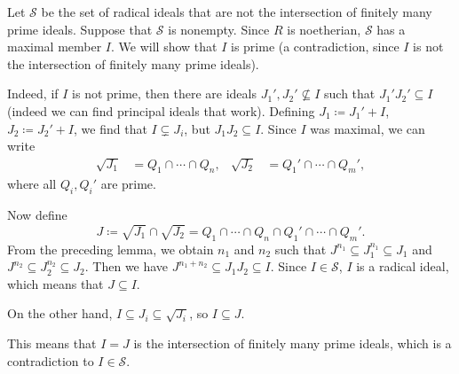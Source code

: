 Let $\mathcal{S}$ be the set of radical ideals that are not the intersection
of finitely many prime ideals. Suppose that $\mathcal{S}$ is nonempty. Since $R$
is noetherian, $\mathcal{S}$ has a maximal member $I$. We will show that $I$ is
prime (a contradiction, since $I$ is not the intersection of finitely many prime
ideals).

Indeed, if $I$ is not prime, then there are ideals $J_1', J_2' \nsubseteq I$ such
that  $J_1'J_2' \subseteq I$ (indeed we can find principal ideals that work).
Defining $J_1\coloneqq J_1' + I$, $J_2\coloneqq J_2' + I$, we find that
$I\subsetneq J_i$, but $J_1J_2 \subseteq I$. Since $I$ was maximal, we can write
\begin{align*}
	\sqrt{J_1} &= Q_1 \cap \cdots \cap Q_n, &
	\sqrt{J_2} &= Q_1'\cap\cdots\cap Q_m',
\end{align*}
where all $Q_i, Q_i'$ are prime.

Now define
\[J\coloneqq \sqrt{J_1}\cap\sqrt{J_2} = Q_1\cap\cdots\cap Q_n \cap Q_1'\cap\cdots\cap Q_m'. \]
From the preceding lemma, we obtain $n_1$ and $n_2$ such that
$J^{n_1} \subseteq J_1^{n_1} \subseteq J_1$ and $J^{n_2} \subseteq J_2^{n_2} \subseteq J_2$.
Then we have $J^{n_1+n_2} \subseteq J_1J_2 \subseteq I$. Since $I \in \mathcal{S}$,
$I$ is a radical ideal, which means that $J \subseteq I$.

On the other hand, $I \subseteq J_i \subseteq \sqrt{J_i}$, so $I \subseteq J$.

This means that $I = J$ is the intersection of finitely many prime ideals, which
is a contradiction to  $I \in \mathcal{S}$.
